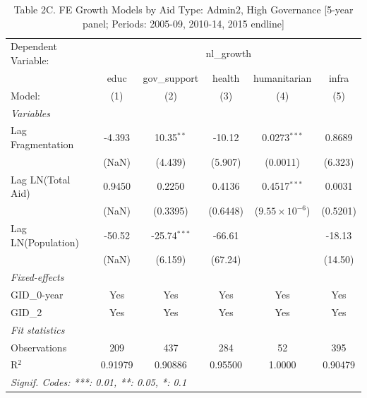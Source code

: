 \begin{table}[H]
   \caption{Table 2C. FE Growth Models by Aid Type: Admin2, High Governance [5-year panel; Periods: 2005-09, 2010-14, 2015 endline]}
   \centering
   \begin{tabular}{lccccc}
      \tabularnewline \midrule \midrule
      Dependent Variable: & \multicolumn{5}{c}{nl\_growth}\\
                         & educ    & gov\_support   & health   & humanitarian            & infra \\   
      Model:             & (1)     & (2)            & (3)      & (4)                     & (5)\\  
      \midrule
      \emph{Variables}\\
      Lag Fragmentation  & -4.393  & 10.35$^{**}$   & -10.12   & 0.0273$^{***}$          & 0.8689\\   
                         & (NaN)   & (4.439)        & (5.907)  & (0.0011)                & (6.323)\\   
      Lag LN(Total Aid)  & 0.9450  & 0.2250         & 0.4136   & 0.4517$^{***}$          & 0.0031\\   
                         & (NaN)   & (0.3395)       & (0.6448) & ($9.55\times 10^{-6}$)  & (0.5201)\\   
      Lag LN(Population) & -50.52  & -25.74$^{***}$ & -66.61   &                         & -18.13\\   
                         & (NaN)   & (6.159)        & (67.24)  &                         & (14.50)\\   
      \midrule
      \emph{Fixed-effects}\\
      GID\_0-year        & Yes     & Yes            & Yes      & Yes                     & Yes\\  
      GID\_2             & Yes     & Yes            & Yes      & Yes                     & Yes\\  
      \midrule
      \emph{Fit statistics}\\
      Observations       & 209     & 437            & 284      & 52                      & 395\\  
      R$^2$              & 0.91979 & 0.90886        & 0.95500  & 1.0000                  & 0.90479\\  
      \midrule \midrule
      \multicolumn{6}{l}{\emph{Signif. Codes: ***: 0.01, **: 0.05, *: 0.1}}\\
   \end{tabular}
\end{table}



